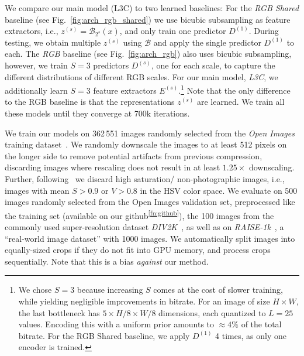 \documentclass[10pt,twocolumn,letterpaper]{article}
\makeatletter
\newcommand{\name}{L3C\xspace}
\newcommand{\Bicubic}{\mathcal{B}}
\newcommand{\raisek}{RAISE-1k\xspace}
\renewcommand{\paragraph}{\@startsection{paragraph}{4}{\z@}{2ex \@plus 1.25ex \@minus .5ex}{-1em}{\normalfont\normalsize\bfseries}}
\makeatother
\begin{document}
\paragraph{Models} We compare our main model (\name) to two learned baselines:
For the \emph{RGB Shared} baseline (see Fig.~\ref{fig:arch_rgb_shared}) we use bicubic subsampling as feature extractors, i.e., $z^{(s)}=\Bicubic_{2^s}(x)$, and only train one predictor $D^{(1)}$. During testing, we obtain multiple $z^{(s)}$ using $\Bicubic$ and apply the single predictor $D^{(1)}$ to each.
The \emph{RGB} baseline (see Fig.~\ref{fig:arch_rgb}) also uses bicubic subsampling, however, we train $S=3$ predictors $D^{(s)}$, one for each scale, to capture the different distributions of different RGB scales.
For our main model, \emph{\name}, we additionally learn $S=3$ feature extractors $E^{(s)}$.\footnote{We chose $S=3$ because increasing $S$ comes at the cost of slower training, while yielding negligible improvements in bitrate. For an image of size $H{\times}W$, the last bottleneck has $5{\times}H/8{\times}W/8$ dimensions, each quantized to $L=25$ values. Encoding this with a uniform prior amounts to ${\approx}4\%$ of the total bitrate. For the RGB Shared baseline, we apply $D^{(1)}$ 4 times, as only one encoder is trained.}
Note that the only difference to the RGB baseline is that the representations $z^{(s)}$ are learned. We train all these models until they converge at 700k iterations. 

\paragraph{Datasets}
We train our models on 362\,551 images randomly selected from the \emph{Open Images} training dataset~\cite{OpenImages}.
We randomly downscale the images to at least 512 pixels on the longer side to remove potential artifacts from previous compression, discarding images where rescaling does not result in at least $1.25\times$ downscaling.
Further, following~\cite{balle2018variational} we discard high saturation/ non-photographic images, i.e., images with mean $S{>}0.9$ or $V{>}0.8$ in the HSV color space.
We evaluate on 500 images randomly selected from the Open Images validation set, 
preprocessed like the training set (available on our github\textsuperscript{\ref{fn:github}}), the 100 images from the commonly used super-resolution dataset \emph{DIV2K}~\cite{agustssondiv2k},
as well as on \emph{\raisek}~\cite{dang2015raise}, a ``real-world image dataset'' with 1000 images. We automatically split images into equally-sized crops if they do not fit into GPU memory,
and process crops sequentially. Note that this is a bias \emph{against} our method.
\end{document}
